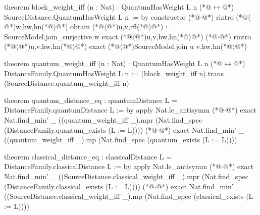 theorem block_weight_iff (n : Nat) : QuantumHasWeight L n (*@$\leftrightarrow$@*) SourceDistance.QuantumHasWeight L n := by
  constructor
  (*@$\cdot$@*) rintro (*@$\langle$@*)w,hw,hn(*@$\rangle$@*)
    obtain (*@$\langle$@*)u,v,rfl(*@$\rangle$@*) := SourceModel.join_surjective w
    exact (*@$\langle$@*)u,v,hw,hn(*@$\rangle$@*)
  (*@$\cdot$@*) rintro (*@$\langle$@*)u,v,hw,hn(*@$\rangle$@*)
    exact (*@$\langle$@*)SourceModel.join u v,hw,hn(*@$\rangle$@*)

theorem quantum_weight_iff (n : Nat) : QuantumHasWeight L n (*@$\leftrightarrow$@*) DistanceFamily.QuantumHasWeight L n :=
  (block_weight_iff n).trans (SourceDistance.quantum_weight_iff n)

theorem quantum_distance_eq : quantumDistance L = DistanceFamily.quantumDistance L := by
  apply Nat.le_antisymm
  (*@$\cdot$@*) exact Nat.find_min' _ ((quantum_weight_iff _).mpr (Nat.find_spec (DistanceFamily.quantum_exists (L := L))))
  (*@$\cdot$@*) exact Nat.find_min' _ ((quantum_weight_iff _).mp (Nat.find_spec (quantum_exists (L := L))))

theorem classical_distance_eq : classicalDistance L = DistanceFamily.classicalDistance L := by
  apply Nat.le_antisymm
  (*@$\cdot$@*) exact Nat.find_min' _ ((SourceDistance.classical_weight_iff _).mpr (Nat.find_spec (DistanceFamily.classical_exists (L := L))))
  (*@$\cdot$@*) exact Nat.find_min' _ ((SourceDistance.classical_weight_iff _).mp (Nat.find_spec (classical_exists (L := L))))
